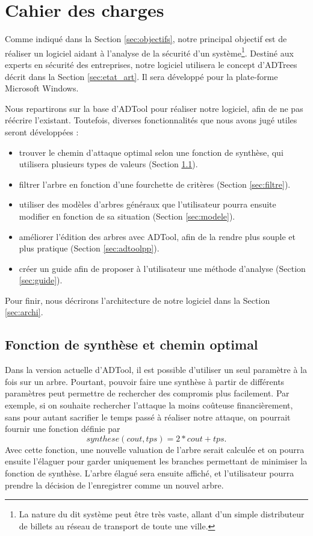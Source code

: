 \section{Cahier des charges}
    \label{sec:cahier}

    Comme indiqué dans la Section \ref{sec:objectifs}, notre principal objectif est de réaliser un logiciel aidant à l'analyse de la sécurité d'un système\footnote{La nature du dit système peut être très vaste, allant d'un simple distributeur de billets au réseau de transport de toute une ville.}. Destiné aux experts en sécurité des entreprises, notre logiciel utilisera le concept d'ADTrees décrit dans la Section \ref{sec:etat_art}. Il sera développé pour la plate-forme Microsoft Windows.

    Nous repartirons sur la base d'ADTool pour réaliser notre logiciel, afin de ne pas réécrire l'existant. Toutefois, diverses fonctionnalités que nous avons jugé utiles seront développées :
    \begin{itemize}
        \item trouver le chemin d'attaque optimal selon une fonction de synthèse, qui utilisera plusieurs types de valeurs (Section \ref{sec:fct_synth}).
        \item filtrer l'arbre en fonction d'une fourchette de critères (Section \ref{sec:filtre}).
        \item utiliser des modèles d'arbres généraux que l'utilisateur pourra ensuite modifier en fonction de sa situation (Section \ref{sec:modele}).
        \item améliorer l'édition des arbres avec ADTool, afin de la rendre plus souple et plus pratique (Section \ref{sec:adtoolpp}).
        \item créer un guide afin de proposer à l'utilisateur une méthode d'analyse (Section \ref{sec:guide}).
    \end{itemize}

    Pour finir, nous décrirons l'architecture de notre logiciel dans la Section \ref{sec:archi}.

    \subsection{Fonction de synthèse et chemin optimal}
        \label{sec:fct_synth}

        Dans la version actuelle d'ADTool, il est possible d'utiliser un seul paramètre à la fois sur un arbre. Pourtant, pouvoir faire une synthèse à partir de différents paramètres peut permettre de rechercher des compromis plus facilement.
        Par exemple, si on souhaite rechercher l'attaque la moins coûteuse financièrement, sans pour autant sacrifier le temps passé à réaliser notre attaque, on pourrait fournir une fonction définie par \[ synthese(cout, tps) = 2*cout + tps . \]
        Avec cette fonction, une nouvelle valuation de l'arbre serait calculée et on pourra ensuite l'élaguer pour garder uniquement les branches permettant de minimiser la fonction de synthèse.
        L'arbre élagué sera ensuite affiché, et l'utilisateur pourra prendre la décision de l'enregistrer comme un nouvel arbre.


